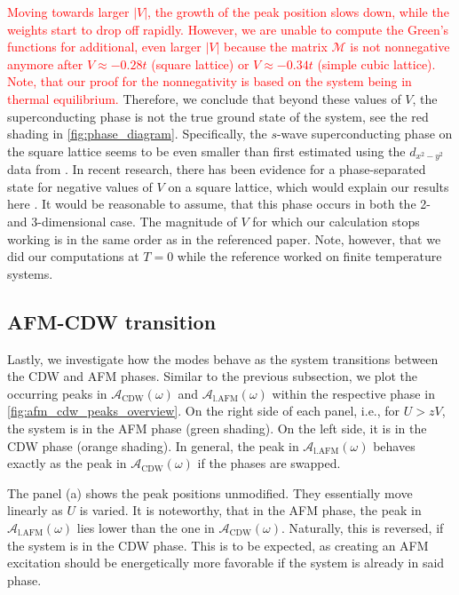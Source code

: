\documentclass[
    reprint, 
    aps,
    preprintnumbers,
    twocolumn,
    prb,
    superscriptaddress
]{revtex4-2}
\newcommand{\mM}{\mathcal{M}}
\newcommand{\spectral}[1]{\mathcal{A}_\text{#1}  (\omega)}
\newcommand{\markEdited}{red}
\begin{document}
\textcolor{\markEdited}{Moving towards larger $|V|$, the growth of the peak position slows down, while the weights start to drop off rapidly.
However, we are unable to compute the Green's functions for additional, even larger $|V|$ because the matrix $\mM$ is not nonnegative anymore after $V\approx -0.28t$ (square lattice) or $V\approx -0.34t$ (simple cubic lattice).
Note, that our proof for the nonnegativity is based on the system being in thermal equilibrium.}
Therefore, we conclude that beyond these values of $V$, the superconducting phase is not the true ground state of the system, see the red shading in \autoref{fig:phase_diagram}.
Specifically, the $s$-wave superconducting phase on the square lattice seems to be even smaller than first estimated using the $d_{x^2 -y^2}$ data from \cite{Micnas88b}.
In recent research, there has been evidence for a phase-separated state for negative values of $V$ on a square lattice, which would explain our results here \cite{Linner23}.
It would be reasonable to assume, that this phase occurs in both the 2- and 3-dimensional case.
The magnitude of $V$ for which our calculation stops working is in the same order as in the referenced paper.
Note, however, that we did our computations at $T=0$ while the reference worked on finite temperature systems.



\subsection{AFM-CDW transition}

Lastly, we investigate how the modes behave as the system transitions between the CDW and AFM phases.
Similar to the previous subsection, we plot the occurring peaks in $\spectral{CDW}$ and $\spectral{l.AFM}$ within the respective phase in \autoref{fig:afm_cdw_peaks_overview}.
On the right side of each panel, i.e., for $U > zV$, the system is in the AFM phase (green shading).
On the left side, it is in the CDW phase (orange shading).
In general, the peak in $\spectral{l.AFM}$ behaves exactly as the peak in $\spectral{CDW}$ if the phases are swapped.

The panel (a) shows the peak positions unmodified. They essentially move linearly as $U$ is varied.
It is noteworthy, that in the AFM phase, the peak in $\spectral{l.AFM}$ lies lower than the one in $\spectral{CDW}$.
Naturally, this is reversed, if the system is in the CDW phase.
This is to be expected, as creating an AFM excitation should be energetically more favorable if the system is already in said phase.
\end{document}
